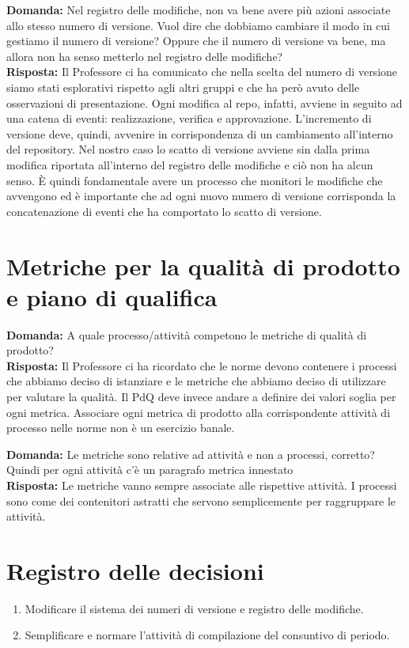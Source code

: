 \documentclass{article}
\begin{document}
\textbf{Domanda:} Nel registro delle modifiche, non va bene avere più azioni associate allo stesso numero di versione.
Vuol dire che dobbiamo cambiare il modo in cui gestiamo il numero di versione?
Oppure che il numero di versione va bene, ma allora non ha senso metterlo nel registro delle modifiche?\\
\textbf{Risposta:} Il Professore ci ha comunicato che nella scelta del numero di versione siamo stati esplorativi rispetto agli altri gruppi e che ha però avuto delle osservazioni di presentazione.
Ogni modifica al repo, infatti, avviene in seguito ad una catena di eventi: realizzazione, verifica e approvazione.
L'incremento di versione deve, quindi, avvenire in corrispondenza di un cambiamento all'interno del repository.
Nel nostro caso lo scatto di versione avviene sin dalla prima modifica riportata all'interno del registro delle modifiche e ciò non ha alcun senso.
È quindi fondamentale avere un processo che monitori le modifiche che avvengono ed è importante che ad ogni nuovo numero di versione corrisponda la concatenazione di eventi che ha comportato lo scatto di versione.

\section{Metriche per la qualità di prodotto e piano di qualifica}%
\label{sec:metriche_per_la_qualita_di_prodotto_e_piano_di_qualifica}

\textbf{Domanda:} A quale processo/attività competono le metriche di qualità di prodotto?\\
\textbf{Risposta:} Il Professore ci ha ricordato che le norme devono contenere i processi che abbiamo deciso di istanziare e le metriche che abbiamo deciso di utilizzare per valutare la qualità.
Il PdQ deve invece andare a definire dei valori soglia per ogni metrica.
Associare ogni metrica di prodotto alla corrispondente attività di processo nelle norme non è un esercizio banale.

\textbf{Domanda:} Le metriche sono relative ad attività e non a processi, corretto? Quindi per ogni attività c’è un paragrafo metrica innestato\\
\textbf{Risposta:} Le metriche vanno sempre associate alle rispettive attività.
I processi sono come dei contenitori astratti che servono semplicemente per raggruppare le attività.

\newpage
\section{Registro delle decisioni}%
\label{sec:registro_delle_decisioni}

\begin{enumerate}
  \item Modificare il sistema dei numeri di versione e registro delle modifiche.
  \item Semplificare e normare l'attività di compilazione del consuntivo di periodo.
\end{enumerate}

\end{document}
